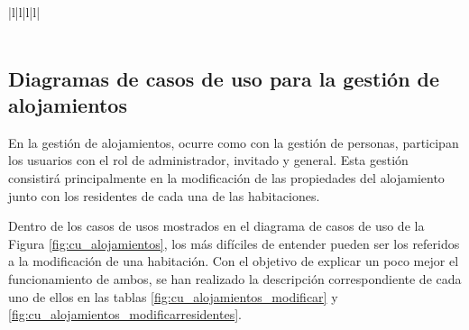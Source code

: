 \begin{table}[hp!]
{\begin{tabular}{|l|l|l|l|}
        \hline
                                                                                                                                                                                                                            \\ 
        \hline
            \\
        \hline
        \end{tabular}
    }
    \caption{Curso de eventos del caso de uso 3}
\end{table}

\newpage

\subsection{Diagramas de casos de uso para la gestión de alojamientos}

En la gestión de alojamientos, ocurre como con la gestión de personas, participan los usuarios con el rol de administrador, invitado y general. Esta gestión consistirá principalmente en la modificación de las propiedades del alojamiento junto con los residentes de cada una de las habitaciones. 

Dentro de los casos de usos mostrados en el diagrama de casos de uso de la Figura \ref{fig:cu_alojamientos}, los más difíciles de entender pueden ser los referidos a la modificación de una habitación. Con el objetivo de explicar un poco mejor el funcionamiento de ambos, se han realizado la descripción correspondiente de cada uno de ellos en las tablas \ref{fig:cu_alojamientos_modificar} y \ref{fig:cu_alojamientos_modificarresidentes}. 

